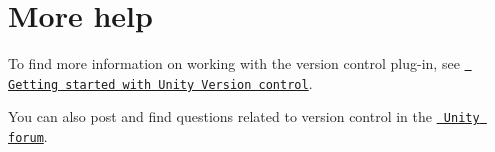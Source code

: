 \chapter{More help}
\hypertarget{md__hey_tea_9_2_library_2_package_cache_2com_8unity_8collab-proxy_0d2_80_85_2_documentation_0i_2_more_help}{}\label{md__hey_tea_9_2_library_2_package_cache_2com_8unity_8collab-proxy_0d2_80_85_2_documentation_0i_2_more_help}
\label{md__hey_tea_9_2_library_2_package_cache_2com_8unity_8collab-proxy_0d2_80_85_2_documentation_0i_2_more_help_autotoc_md887}%
%
 To find more information on working with the  version control plug-\/in, see \href{https://docs.unity3d.com/2022.1/Documentation/Manual/PlasticSCMPluginGettingStarted.html}{\texttt{ Getting started with Unity Version control}}.

You can also post and find questions related to  version control in the \href{https://forum.unity.com/forums/plastic-scm.605/}{\texttt{ Unity forum}}. 